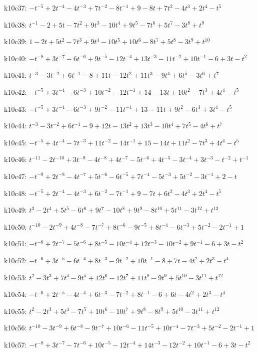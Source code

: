 k10c37: $-t^{-5}+2t^{-4}-4t^{-3}+7t^{-2}-8t^{-1}+9-8t+7t^{2}-4t^{3}+2t^{4}-t^{5}$

k10c38: $t^{-1}-2+5t-7t^{2}+9t^{3}-10t^{4}+9t^{5}-7t^{6}+5t^{7}-3t^{8}+t^{9}$

k10c39: $1-2t+5t^{2}-7t^{3}+9t^{4}-10t^{5}+10t^{6}-8t^{7}+5t^{8}-3t^{9}+t^{10}$

k10c40: $-t^{-8}+3t^{-7}-6t^{-6}+9t^{-5}-12t^{-4}+13t^{-3}-11t^{-2}+10t^{-1}-6+3t-t^{2}$

k10c41: $t^{-3}-3t^{-2}+6t^{-1}-8+11t-12t^{2}+11t^{3}-9t^{4}+6t^{5}-3t^{6}+t^{7}$

k10c42: $-t^{-5}+3t^{-4}-6t^{-3}+10t^{-2}-12t^{-1}+14-13t+10t^{2}-7t^{3}+4t^{4}-t^{5}$

k10c43: $-t^{-5}+3t^{-4}-6t^{-3}+9t^{-2}-11t^{-1}+13-11t+9t^{2}-6t^{3}+3t^{4}-t^{5}$

k10c44: $t^{-3}-3t^{-2}+6t^{-1}-9+12t-13t^{2}+13t^{3}-10t^{4}+7t^{5}-4t^{6}+t^{7}$

k10c45: $-t^{-5}+4t^{-4}-7t^{-3}+11t^{-2}-14t^{-1}+15-14t+11t^{2}-7t^{3}+4t^{4}-t^{5}$

k10c46: $t^{-11}-2t^{-10}+3t^{-9}-4t^{-8}+4t^{-7}-5t^{-6}+4t^{-5}-3t^{-4}+3t^{-3}-t^{-2}+t^{-1}$

k10c47: $-t^{-9}+2t^{-8}-4t^{-7}+5t^{-6}-6t^{-5}+7t^{-4}-5t^{-3}+5t^{-2}-3t^{-1}+2-t$

k10c48: $-t^{-5}+2t^{-4}-4t^{-3}+6t^{-2}-7t^{-1}+9-7t+6t^{2}-4t^{3}+2t^{4}-t^{5}$

k10c49: $t^{3}-2t^{4}+5t^{5}-6t^{6}+9t^{7}-10t^{8}+9t^{9}-8t^{10}+5t^{11}-3t^{12}+t^{13}$

k10c50: $t^{-10}-2t^{-9}+4t^{-8}-7t^{-7}+8t^{-6}-9t^{-5}+8t^{-4}-6t^{-3}+5t^{-2}-2t^{-1}+1$

k10c51: $-t^{-8}+2t^{-7}-5t^{-6}+8t^{-5}-10t^{-4}+12t^{-3}-10t^{-2}+9t^{-1}-6+3t-t^{2}$

k10c52: $-t^{-6}+3t^{-5}-6t^{-4}+8t^{-3}-9t^{-2}+10t^{-1}-8+7t-4t^{2}+2t^{3}-t^{4}$

k10c53: $t^{2}-3t^{3}+7t^{4}-9t^{5}+12t^{6}-12t^{7}+11t^{8}-9t^{9}+5t^{10}-3t^{11}+t^{12}$

k10c54: $-t^{-6}+2t^{-5}-4t^{-4}+6t^{-3}-7t^{-2}+8t^{-1}-6+6t-4t^{2}+2t^{3}-t^{4}$

k10c55: $t^{2}-2t^{3}+5t^{4}-7t^{5}+10t^{6}-10t^{7}+9t^{8}-8t^{9}+5t^{10}-3t^{11}+t^{12}$

k10c56: $t^{-10}-3t^{-9}+6t^{-8}-9t^{-7}+10t^{-6}-11t^{-5}+10t^{-4}-7t^{-3}+5t^{-2}-2t^{-1}+1$

k10c57: $-t^{-8}+3t^{-7}-7t^{-6}+10t^{-5}-12t^{-4}+14t^{-3}-12t^{-2}+10t^{-1}-6+3t-t^{2}$

